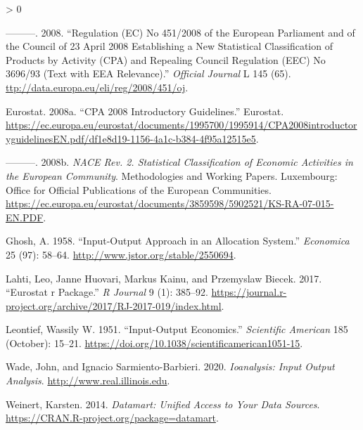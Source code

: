 \documentclass[
]{article}
\newlength{\cslhangindent}
\newenvironment{CSLReferences}[2] %
 {%
  \setlength{\parindent}{0pt}
  \ifodd #1 \everypar{\setlength{\hangindent}{\cslhangindent}}\ignorespaces\fi
  \ifnum #2 > 0
  \setlength{\parskip}{#2\baselineskip}
  \fi
 }%
 {}
\begin{document}
\begin{CSLReferences}{1}{0}
\leavevmode\hypertarget{ref-32008R0451}{}%
---------. 2008. {``Regulation ({EC}) No 451/2008 of the European
Parliament and of the Council of 23 April 2008 Establishing a New
Statistical Classification of Products by Activity ({CPA}) and Repealing
Council Regulation ({EEC}) No 3696/93 (Text with {EEA} Relevance).''}
\emph{Official Journal} L 145 (65).
\url{ttp://data.europa.eu/eli/reg/2008/451/oj}.

\leavevmode\hypertarget{ref-eurostat_cpa_introductory_2008}{}%
Eurostat. 2008a. {``{CPA} 2008 Introductory Guidelines.''} {Eurostat}.
\url{https://ec.europa.eu/eurostat/documents/1995700/1995914/CPA2008introductoryguidelinesEN.pdf/df1e8d19-1156-4a1c-b384-4f95a12515e5}.

\leavevmode\hypertarget{ref-eurostat_nace_rev2_2008}{}%
---------. 2008b. \emph{{NACE} Rev. 2. Statistical Classification of
Economic Activities in the European Community}. Methodologies and
Working Papers. Luxembourg: Office for Official Publications of the
European Communities.
\url{https://ec.europa.eu/eurostat/documents/3859598/5902521/KS-RA-07-015-EN.PDF}.

\leavevmode\hypertarget{ref-ghosh_1958}{}%
Ghosh, A. 1958. {``Input-Output Approach in an Allocation System.''}
\emph{Economica} 25 (97): 58--64.
\url{http://www.jstor.org/stable/2550694}.

\leavevmode\hypertarget{ref-eurostat_r_package}{}%
Lahti, Leo, Janne Huovari, Markus Kainu, and Przemyslaw Biecek. 2017.
{``Eurostat r Package.''} \emph{R Journal} 9 (1): 385--92.
\url{https://journal.r-project.org/archive/2017/RJ-2017-019/index.html}.

\leavevmode\hypertarget{ref-leontief_io_1951}{}%
Leontief, Wassily W. 1951. {``Input-Output Economics.''}
\emph{Scientific American} 185 (October): 15--21.
\url{https://doi.org/10.1038/scientificamerican1051-15}.

\leavevmode\hypertarget{ref-R-ioanalysis}{}%
Wade, John, and Ignacio Sarmiento-Barbieri. 2020. \emph{Ioanalysis:
Input Output Analysis}. \url{http://www.real.illinois.edu}.

\leavevmode\hypertarget{ref-R-datamart}{}%
Weinert, Karsten. 2014. \emph{Datamart: Unified Access to Your Data
Sources}. \url{https://CRAN.R-project.org/package=datamart}.

\end{CSLReferences}
\end{document}

